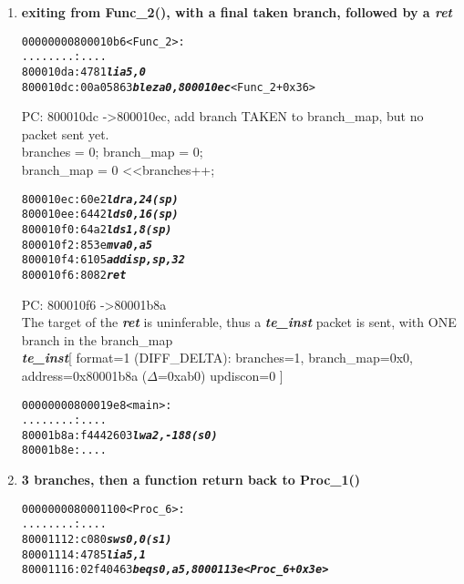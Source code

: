 \begin{enumerate}
\item
  \textbf{exiting from Func\_2(), with a final taken branch, followed by a \textit{ret}}
  \begin {alltt}
00000000800010b6 <Func\_2>:
    ........:   ....
    800010da:	4781                    \textbf{\textit{li	a5,0}}
    800010dc:	00a05863                \textbf{\textit{blez	a0,800010ec}} <Func\_2+0x36>
  \end{alltt}

  \begin{frame}

    PC: 800010dc -\textgreater 800010ec, add branch TAKEN to branch\_map, but no packet sent yet.\\
    branches = 0; branch\_map = 0;\\
    branch\_map \textbar= 0 \textless\textless branches++;
  \end{frame}

  \begin {alltt}
    800010ec:   60e2                    \textbf{\textit{ld      ra,24(sp)}}
    800010ee:   6442                    \textbf{\textit{ld      s0,16(sp)}}
    800010f0:   64a2                    \textbf{\textit{ld      s1,8(sp)}}
    800010f2:   853e                    \textbf{\textit{mv      a0,a5}}
    800010f4:   6105                    \textbf{\textit{addi    sp,sp,32}}
    800010f6:   8082                    \textbf{\textit{ret}}
    \end{alltt}

  \begin{frame}

    PC: 800010f6 -\textgreater 80001b8a\\
    The target of the \textbf{\textit{ret}} is uninferable, thus a \textbf{\textit{te\_inst}} packet is sent, with ONE branch in the branch\_map\\
    \textbf{\textit{te\_inst}}[ format=1 (DIFF\_DELTA): branches=1, branch\_map=0x0, address=0x80001b8a ($\Delta$=0xab0) updiscon=0 ]
  \end {frame}
  
  \begin {alltt}
00000000800019e8 <main>:
    ........:   ....
    80001b8a:	f4442603                \textbf{\textit{lw      a2,-188(s0)}}
    80001b8e:	....
  \end{alltt}
  
\item
  \textbf{3 branches, then a function return back to Proc\_1()}

  \begin {alltt}
0000000080001100 <Proc\_6>:
    ........:   ....
    80001112:	c080                    \textbf{\textit{sw	s0,0(s1)}}
    80001114:	4785                    \textbf{\textit{li	a5,1}}
    80001116:	02f40463                \textbf{\textit{beq	s0,a5,8000113e <Proc_6+0x3e>}}
  \end{alltt}
  

\end{enumerate}

